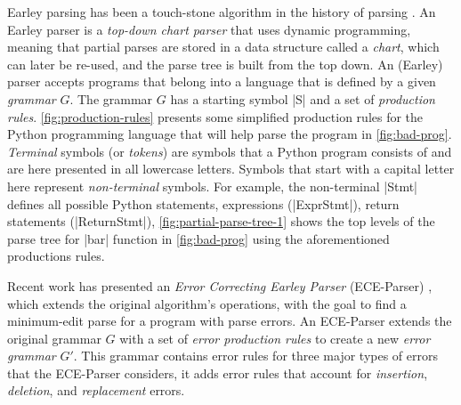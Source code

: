  Earley parsing has been a touch-stone
algorithm in the history of parsing \citep{Earley_1970}. An Earley parser is a
\emph{top-down chart parser} that uses dynamic programming, meaning that partial
parses are stored in a data structure called a \emph{chart}, which can later be
re-used, and the parse tree is built from the top down. An (Earley) parser
accepts programs that belong into a language that is defined by a given
\emph{grammar} $G$. The grammar $G$ has a starting symbol |S| and a set of
\emph{production rules}. \autoref{fig:production-rules} presents some simplified
production rules for the Python programming language that will help parse the
program in \autoref{fig:bad-prog}. \emph{Terminal} symbols (or \emph{tokens})
are symbols that a Python program consists of and are here presented in all
lowercase letters. Symbols that start with a capital letter here represent
\emph{non-terminal} symbols. For example, the non-terminal |Stmt| defines all
possible Python statements, \ie expressions (|ExprStmt|), return statements
(|ReturnStmt|), \etc \autoref{fig:partial-parse-tree-1} shows the top levels of
the parse tree for |bar| function in \autoref{fig:bad-prog} using the
aforementioned productions rules.


%

 Recent work has presented an \emph{Error
Correcting Earley Parser} (ECE-Parser) \citep{Aho_1972}, which extends the
original algorithm's operations, with the goal to find a minimum-edit parse for
a program with parse errors. An ECE-Parser extends the original grammar $G$ with
a set of \emph{error production rules} to create a new \emph{error grammar}
$G'$. This grammar contains error rules for three major types of errors that the
ECE-Parser considers, \ie it adds error rules that account for \emph{insertion},
\emph{deletion}, and \emph{replacement} errors.


